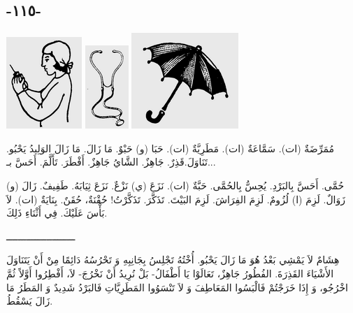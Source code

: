 \documentclass[a5paper]{article}
\begin{document}
\subsection{-١١٥-}
 \includegraphics[width=1.1252in,height=1.3646in]{images/MuhammadBagauddinprettified-img320.png}   \includegraphics[width=0.6457in,height=1.2398in]{images/MuhammadBagauddinprettified-img321.png}   \includegraphics[width=1.5937in,height=1.4272in]{images/MuhammadBagauddinprettified-img322.png} 

مُمَرِّضَةٌ (ات). سَمَّاعَةٌ (ات). مَطَرِيَّةٌ (ات). حَبَا (و) حَبْوٌ. مَا زَالَ. مَا زَالَ الوَلِيدُ يَحْبُو. تَنَاوَلَ.قَذِرٌ. جَاهِزٌ. الشَّايُ جَاهِزٌ. أَفْطَرَ. تَأَلَّمَ. أَحَسَّ بـ...

حُمَّى. أَحَسَّ بِالبَرْدِ. يُحِسُّ بِالحُمَّى. حَبَّةٌ (ات). نَزَعَ (ي) نَزْعٌ. نَزَعَ ثِيَابَهُ. طَفِيفٌ. زَالَ (و) زَوَالٌ. لَزِمَ (ا) لُزُومٌ. لَزِمَ الفِرَاشَ. لَزِمَ البَيْتَ. تَذَكَّرَ. تَذَكَّرْتُ! حُقْنَةٌ، حُقَنٌ. بِنَايَةٌ (ات). لاَ بَأْسَ عَلَيْكَ. فِي أَثْنَاءِ ذَلِكَ.

ــــــــــــــــــــــــ

هِشَامٌ لاَ يَمْشِي بَعْدُ هُوَ مَا زَالَ يَحْبُو. أُخْتُهُ تَجْلِسُ بِجَانِبِهِ وَ تَحْرُسُهُ دَائِمًا مِنْ أَنْ يَتَنَاوَلَ الأَشْيَاءَ القَذِرَةَ. الفُطُورُ جَاهِزٌ، تَعَالَوْا يَا أَطْفَالُ- بَلْ نُرِيدُ أَنْ نَخْرُجَ- لاَ، أَفْطِرُوا أَوَّلاً ثُمَّ اخْرُجُو، وَ إِذَا خَرَجْتُمْ فَالْبَسُوا المَعَاطِفَ وَ لاَ تَنْسَوُوا المَطَرِيَّاتِ فَالبَرْدُ شَدِيدٌ وَ المَطَرُ مَا زَالَ يَسْقُطُ.
\end{document}
